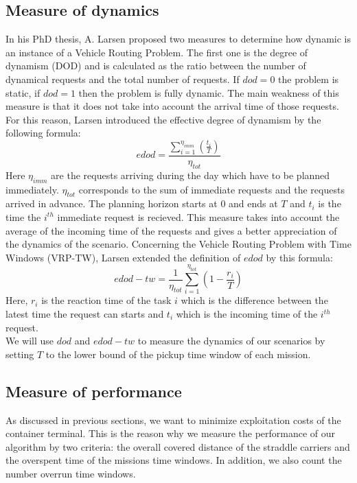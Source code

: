 \documentclass[a4paper,12pt]{article}
\begin{document}
	\subsection{Measure of dynamics}
In his PhD thesis\cite{Larsen00}, A. Larsen proposed two measures to determine how dynamic is an instance of a Vehicle Routing Problem. The first one is the degree of dynamism (DOD) and is calculated as the ratio between the number of dynamical requests and the total number of requests. If $dod=0$ the problem is static, if $dod=1$ then the problem is fully dynamic. The main weakness of this measure is that it does not take into account the arrival time of those requests. For this reason, Larsen introduced the effective degree of dynamism by the following formula: 
\begin{equation*}
 edod = \frac{\sum_{i=1}^{\eta_{imm}}\left(\frac{t_i}{T}\right)}{\eta_{tot}}
\end{equation*}
Here $\eta_{imm}$ are the requests arriving during the day which have to be planned immediately. $\eta_{tot}$ corresponds to the sum of immediate requests and the requests arrived in advance. The planning horizon starts at $0$ and ends at $T$ and $t_i$ is the time the $i^{th}$ immediate request is recieved. This measure takes into account the average of the incoming time of the requests and gives a better appreciation of the dynamics of the scenario.
Concerning the Vehicle Routing Problem with Time Windows (VRP-TW), Larsen extended the definition of $edod$ by this formula: 
\begin{equation*}
 edod-tw = \frac{1}{\eta_{tot}} \sum_{i=1}^{\eta_{tot}} \left(1 - \frac{r_i}{T}\right)
\end{equation*}
Here, $r_i$ is the reaction time of the task $i$ which is the difference between the latest time the request can starts and $t_i$ which is the incoming time of the $i^{th}$ request.\\

We will use $dod$ and $edod-tw$ to measure the dynamics of our scenarios by setting $T$ to the lower bound of the pickup time window of each mission.

	\subsection{Measure of performance}
As discussed in previous sections, we want to minimize exploitation costs of the container terminal. This is the reason why we measure the performance of our algorithm by two criteria: the overall covered distance of the straddle carriers and the overspent time of the missions time windows. In addition, we also count the number overrun time windows.
\end{document}
